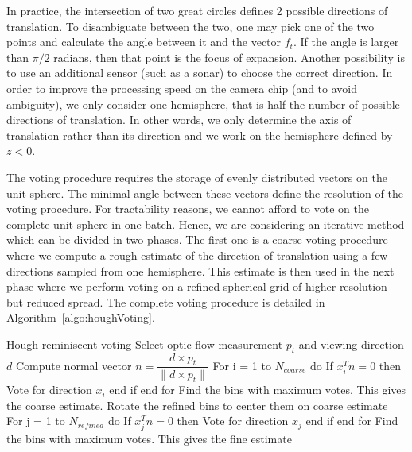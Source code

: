 In practice, the intersection of two great circles defines 2 possible directions of translation. To disambiguate between the two, one may pick one of the two points and calculate the angle between it and the vector $f_t$. If the angle is larger than $\pi/2$ radians, then that point is the focus of expansion. Another possibility is to use an additional sensor (such as a sonar) to choose the correct direction. In order to improve the processing speed on the camera chip (and to avoid ambiguity), we only consider one hemisphere, that is half the number of possible directions of translation. In other words, we only determine the axis of translation rather than its direction and we work on the hemisphere defined by $z<0$.

The voting procedure requires the storage of evenly distributed vectors on the unit sphere. The minimal angle between these vectors define the resolution of the voting procedure. For tractability reasons, we cannot afford to vote on the complete unit sphere in one batch. Hence, we are considering an iterative method which can be divided in two phases. The first one is a coarse voting procedure where we compute a rough estimate of the direction of translation using a few directions sampled from one hemisphere. This estimate is then used in the next phase where we perform voting on a refined spherical grid of higher resolution but reduced spread. The complete voting procedure is detailed in Algorithm~\ref{algo:houghVoting}.

\begin{algorithm}[colback=white, label=algo:houghVoting]{Hough-reminiscent voting}
Select optic flow measurement $p_t$ and viewing direction $d$
Compute normal vector $n = \dfrac{d \times p_t}{\|d \times p_t\|}$
For i = 1 to $N_{coarse}$ do
   If $x_i^Tn = 0$ then
      Vote for direction $x_i$
   end if
end for
Find the bins with maximum votes. This gives the coarse estimate.
Rotate the refined bins to center them on coarse estimate
For j = 1 to $N_{refined}$ do
   If $x_j^Tn = 0$ then
      Vote for direction $x_j$
   end if
end for
Find the bins with maximum votes. This gives the fine estimate
\end{algorithm}

